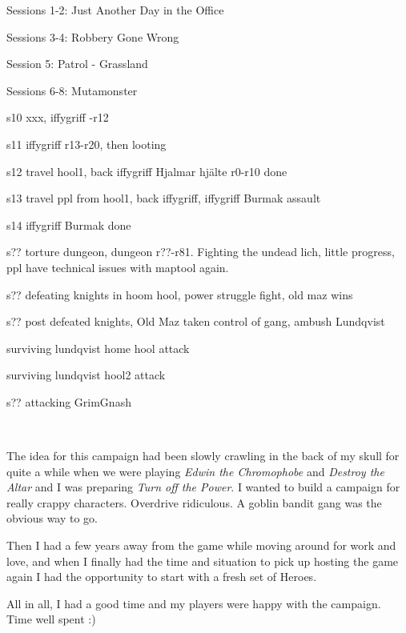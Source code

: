 Sessions 1-2: Just Another Day in the Office

Sessions 3-4: Robbery Gone Wrong

Session 5: Patrol - Grassland

Sessions 6-8: Mutamonster



s10 xxx, iffygriff -r12

s11 iffygriff  r13-r20, then looting

s12 travel hool1, back iffygriff Hjalmar hjälte r0-r10 done

s13 travel ppl from hool1, back iffygriff, iffygriff Burmak assault

s14 iffygriff Burmak done




s?? torture dungeon, dungeon r??-r81. 
Fighting the undead lich, little progress, ppl have technical issues with maptool again.



% 

s?? defeating knights in hoom hool, power struggle fight, old maz wins

s?? post defeated knights, Old Maz taken control of gang, ambush Lundqvist



surviving lundqvist home hool attack



surviving lundqvist hool2 attack



s?? attacking GrimGnash

\



The idea for this campaign had been slowly crawling in the back of my skull for quite a while when we were playing \emph{Edwin the Chromophobe} and \emph{Destroy the Altar} and I was preparing \emph{Turn off the Power}. I wanted to build a campaign for really crappy characters. Overdrive ridiculous. A goblin bandit gang was the obvious way to go.

Then I had a few years away from the game while moving around for work and love, and when I finally had the time and situation to pick up hosting the game again I had the opportunity to start with a fresh set of Heroes.

All in all, I had a good time and my players were happy with the campaign. Time well spent :)



